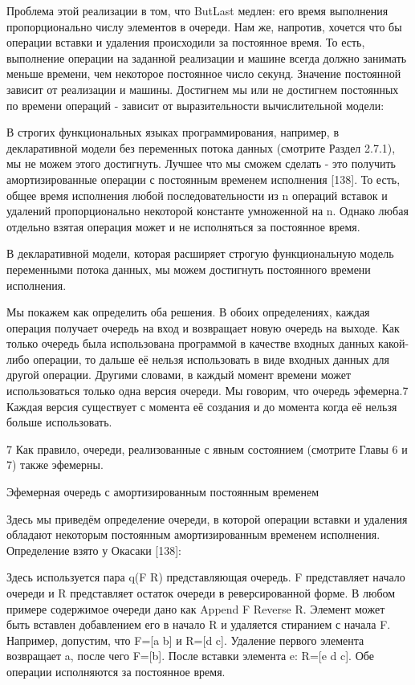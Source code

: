 Проблема этой реализации в том, что ButLast медлен: его время выполнения пропорционально числу элементов в очереди. Нам же, напротив, хочется что бы операции вставки и удаления происходили за постоянное время. То есть, выполнение операции на заданной реализации и машине всегда должно занимать меньше времени, чем некоторое постоянное число секунд. Значение постоянной зависит от реализации и машины. Достигнем мы или не достигнем постоянных по времени операций - зависит от выразительности вычислительной модели:

В строгих функциональных языках программирования, например, в декларативной модели без переменных потока данных (смотрите Раздел 2.7.1), мы не можем этого достигнуть. Лучшее что мы сможем сделать - это получить амортизированные операции с постоянным временем исполнения [138]. То есть, общее время исполнения любой последовательности из n операций вставок и удалений пропорционально некоторой константе умноженной на n. Однако любая отдельно взятая операция может и не исполняться за постоянное время.

В декларативной модели, которая расширяет строгую функциональную модель переменными потока данных, мы можем достигнуть постоянного времени исполнения.

Мы покажем как определить оба решения. В обоих определениях, каждая операция получает очередь на вход и возвращает новую очередь на выходе. Как только очередь была использована программой в качестве входных данных какой-либо операции, то дальше её нельзя использовать в виде входных данных для другой операции. Другими словами, в каждый момент времени может использоваться только одна версия очереди. Мы говорим, что очередь эфемерна.7 Каждая версия существует с момента её создания и до момента когда её нельзя больше использовать.

7 Как правило, очереди, реализованные с явным состоянием (смотрите Главы 6 и 7) также эфемерны.

Эфемерная очередь с амортизированным постоянным временем

Здесь мы приведём определение очереди, в которой операции вставки и удаления обладают некоторым постоянным амортизированным временем исполнения. Определение взято у Окасаки [138]:

Здесь используется пара q(F R) представляющая очередь. F представляет начало очереди и R представляет остаток очереди в реверсированной форме. В любом примере содержимое очереди дано как {Append F {Reverse R}}. Элемент может быть вставлен добавлением его в начало R и удаляется стиранием с начала F. Например, допустим, что F=[a b] и R=[d c]. Удаление первого элемента возвращает a, после чего F=[b]. После вставки элемента e: R=[e d c]. Обе операции исполняются за постоянное время.

